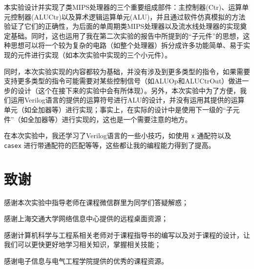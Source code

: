 \documentclass{cumcm}
\numberwithin{equation}{section}
\numberwithin{equation}{subsection}
\begin{document}
本实验设计并实现了类MIPS处理器的三个重要组成部件：主控制器(Ctr)、运算单元控制器(ALUCtr)以及算术逻辑运算单元(ALU)，并且通过软件仿真模拟的方法验证了它们的正确性，为后面的单周期类MIPS处理器以及流水线处理器的实现奠定基础。同时，这也运用了我在第二次实验的报告中所提到的“子元件”的思想，这种思想可以将一个较为复杂的电路（如整个处理器）拆分成许多功能简单、易于实现的元件进行实现（如本次实验中实现的三个小元件）。

同时，本次实验实现的内容都较为基础，并没有涉及到更多类型的指令，如果需要支持更多类型的指令可能需要对某些控制信号（如ALUOp和ALUCtrOut）做进一步的设计（这个在接下来的实验中会有所体现）。另外，本次实验中为了方便，我们运用Verilog语言的提供的运算符号进行ALU的设计，并没有运用其提供的运算单元（如全加器等）进行实现；事实上，在实际的设计中是使用下一级的“子元件”（如全加器等）进行实现的，这也是一个需要注意的地方。

在本次实验中，我还学习了Verilog语言的一些小技巧，如使用 \texttt{x} 通配符以及 \texttt{casex} 进行带通配符的匹配等等，这些都让我的编程能力得到了提高。

\section{致谢}\label{section6}
感谢本次实验中指导老师在课程微信群里为同学们答疑解惑；

感谢上海交通大学网络信息中心提供的远程桌面资源；

感谢计算机科学与工程系相关老师对于课程指导书的编写以及对于课程的设计，让我们可以更快更好地学习相关知识，掌握相关技能；

感谢电子信息与电气工程学院提供的优秀的课程资源。
%
%
\end{document}
